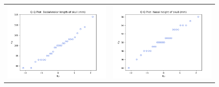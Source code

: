 \begin{enumerate}[label= (\alph*)]
\begin{figure}[H]
\begin{tabular}{cc}
            \includegraphics[scale=0.30]{./python/chapter-5/Question-5-23-a-QQ-BasLength.png} &
            \includegraphics[scale=0.30]{./python/chapter-5/Question-5-23-a-QQ-NasHeight.png}
        \end{tabular}
    \end{figure}


\end{enumerate}
